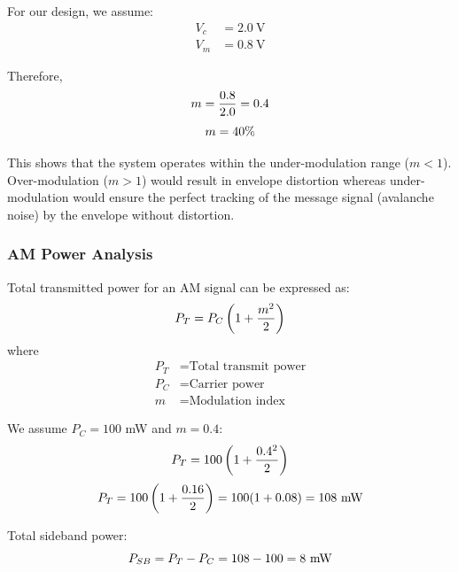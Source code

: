 \documentclass[12pt,a4paper]{report}
\begin{document}
	For our design, we assume:
	\begin{align*}
		V_c &= 2.0\ \text{V} \\
		V_m &= 0.8\ \text{V}
	\end{align*}
	
	Therefore,
	\begingroup
	\setlength{\mathindent}{0pt}
	\begin{equation*}
		\hfill
		m = \frac{0.8}{2.0} = 0.4
		\hfill
	\end{equation*}
	\endgroup
	\begingroup
	\setlength{\mathindent}{0pt}
	\begin{equation*}
		\hfill
		m = 40\%
		\hfill
	\end{equation*}
	\endgroup
	
	This shows that the system operates within the under-modulation range ($m < 1$). Over-modulation ($m > 1$) would result in envelope distortion whereas under-modulation would ensure the perfect tracking of the message signal (avalanche noise) by the envelope without distortion.
	
	\subsubsection{AM Power Analysis}
	Total transmitted power for an AM signal can be expressed as:
	\begingroup
	\setlength{\mathindent}{0pt}
	\begin{equation*}
		\hfill
		P_T = P_C \left(1 + \frac{m^2}{2}\right)
		\hfill
	\end{equation*}
	\endgroup
	where
	\begin{align*}
		P_T &= \text{Total transmit power} \\
		P_C &= \text{Carrier power} \\
		m &= \text{Modulation index}
	\end{align*}
	
	We assume $P_C = 100$ mW and $m = 0.4$:
	\begingroup
	\setlength{\mathindent}{0pt}
	\begin{equation*}
		\hfill
		P_T = 100 \left(1 + \frac{0.4^2}{2}\right)
		\hfill
	\end{equation*}
	\endgroup
	\begingroup
	\setlength{\mathindent}{0pt}
	\begin{equation*}
		\hfill
		P_T = 100 \left(1 + \frac{0.16}{2}\right) = 100(1 + 0.08) = 108\ \text{mW}
		\hfill
	\end{equation*}
	\endgroup
	
	Total sideband power:
	\begingroup
	\setlength{\mathindent}{0pt}
	\begin{equation*}
		\hfill
		P_{SB} = P_T - P_C = 108 - 100 = 8\ \text{mW}
		\hfill
	\end{equation*}
	\endgroup
	
\end{document}
